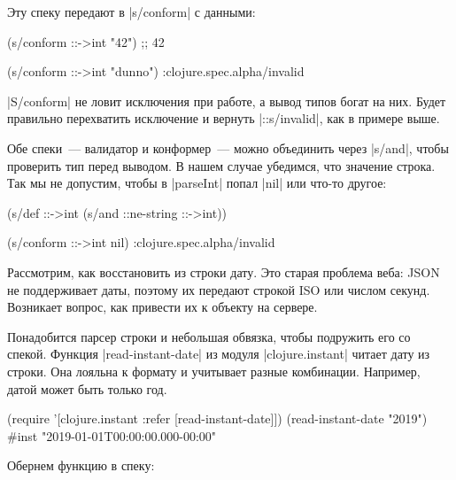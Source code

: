 \noindent
Эту спеку передают в \spverb|s/conform| с данными:

\begin{english}
  \begin{clojure}
(s/conform ::->int "42") ;; 42

(s/conform ::->int "dunno")
:clojure.spec.alpha/invalid
  \end{clojure}
\end{english}


\spverb|S/conform| не ловит исключения при работе, а вывод типов богат на
них. Будет правильно перехватить исключение и вернуть \spverb|::s/invalid|, как
в примере выше.

Обе спеки~--- валидатор и конформер~--- можно объединить через \spverb|s/and|,
чтобы проверить тип перед выводом. В нашем случае убедимся, что значение
строка. Так мы не допустим, чтобы в \spverb|parseInt| попал \spverb|nil| или
что-то другое:

\begin{english}
  \begin{clojure}
(s/def ::->int
  (s/and ::ne-string ::->int))

(s/conform ::->int nil)
:clojure.spec.alpha/invalid
  \end{clojure}
\end{english}

Рассмотрим, как восстановить из строки дату. Это старая проблема веба: JSON не
поддерживает даты, поэтому их передают строкой ISO или числом секунд. Возникает
вопрос, как привести их к объекту на сервере.


Понадобится парсер строки и небольшая обвязка, чтобы подружить его со
спекой. Функция \spverb|read-instant-date| из модуля \spverb|clojure.instant|
читает дату из строки. Она лояльна к формату и учитывает разные
комбинации. Например, датой может быть только год.


\begin{english}
  \begin{clojure}
(require '[clojure.instant :refer [read-instant-date]])
(read-instant-date "2019")
#inst "2019-01-01T00:00:00.000-00:00"
  \end{clojure}
\end{english}

\noindent
Обернем функцию в спеку:

